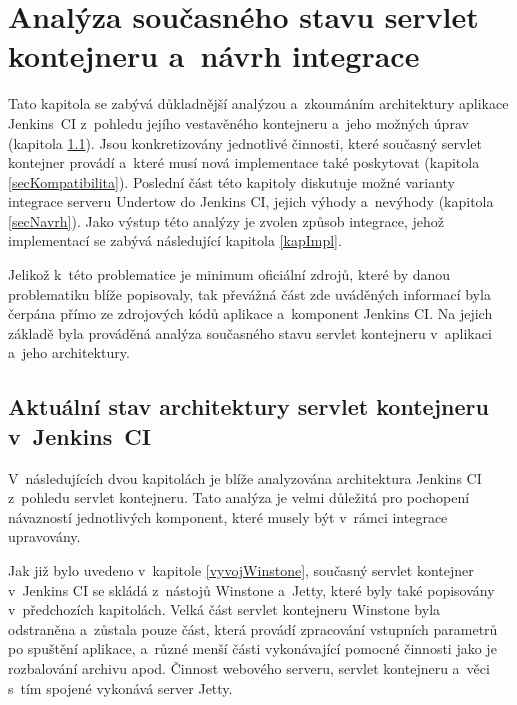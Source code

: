\chapter{Analýza současného stavu servlet kontejneru a~návrh integrace} \label{kapAnalyza}
    Tato kapitola se zabývá důkladnější analýzou a~zkoumáním architektury aplikace Jenkins~CI
    z~pohledu jejího vestavěného kontejneru a~jeho možných úprav (kapitola \ref{secArchitecture}). 
    Jsou konkretizovány jednotlivé činnosti, které současný servlet kontejner provádí
    a~které musí nová implementace také poskytovat (kapitola \ref{secKompatibilita}).
    Poslední část této kapitoly diskutuje možné varianty integrace serveru Undertow do Jenkins CI,
    jejich výhody a~nevýhody (kapitola \ref{secNavrh}). Jako výstup této analýzy je zvolen způsob integrace, jehož
    implementací se zabývá následující kapitola \ref{kapImpl}.

    Jelikož k~této problematice je minimum oficiální zdrojů, které by danou problematiku blíže popisovaly, 
    tak převážná část zde uváděných informací byla čerpána přímo ze zdrojových kódů aplikace a~komponent Jenkins CI.
    Na jejich základě byla prováděná analýza současného stavu servlet kontejneru v~aplikaci a~jeho architektury.
    
    \section{Aktuální stav architektury servlet kontejneru v~Jenkins~CI}\label{secArchitecture}
        V~následujících dvou kapitolách je blíže analyzována architektura
        Jenkins CI z~pohledu servlet kontejneru. Tato analýza je velmi důležitá
        pro pochopení návazností jednotlivých komponent, které musely být v~rámci integrace upravovány.

        Jak již bylo uvedeno v~kapitole \ref{vyvojWinstone}, současný servlet kontejner 
        v~Jenkins CI se skládá z~nástojů Winstone a~Jetty, které byly také popisovány
        v~předchozích kapitolách. Velká část servlet
        kontejneru Winstone byla odstraněna a~zůstala pouze část, která
        provádí zpracování vstupních parametrů po spuštění aplikace, a~různé menší části
        vykonávající pomocné činnosti jako je rozbalování archivu apod. Činnost webového serveru, servlet kontejneru
        a~věci s~tím spojené vykonává server Jetty.
        

